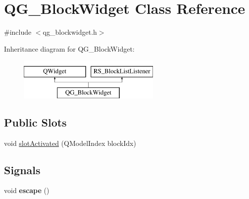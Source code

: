 \hypertarget{classQG__BlockWidget}{\section{Q\-G\-\_\-\-Block\-Widget Class Reference}
\label{classQG__BlockWidget}
}


{\ttfamily \#include $<$qg\-\_\-blockwidget.\-h$>$}

Inheritance diagram for Q\-G\-\_\-\-Block\-Widget\-:\begin{figure}[H]
\begin{center}
\leavevmode
\includegraphics[height=2.000000cm]{classQG__BlockWidget}
\end{center}
\end{figure}
\subsection*{Public Slots}
\begin{DoxyCompactItemize}
\item 
void \hyperlink{classQG__BlockWidget_a1ba391712d62ae327328cdcbf26d04e6}{slot\-Activated} (Q\-Model\-Index block\-Idx)
\end{DoxyCompactItemize}
\subsection*{Signals}
\begin{DoxyCompactItemize}
\item 
\hypertarget{classQG__BlockWidget_a0138d7be563c9cf3184a5119516f2674}{void {\bfseries escape} ()}\label{classQG__BlockWidget_a0138d7be563c9cf3184a5119516f2674}

\end{DoxyCompactItemize}

